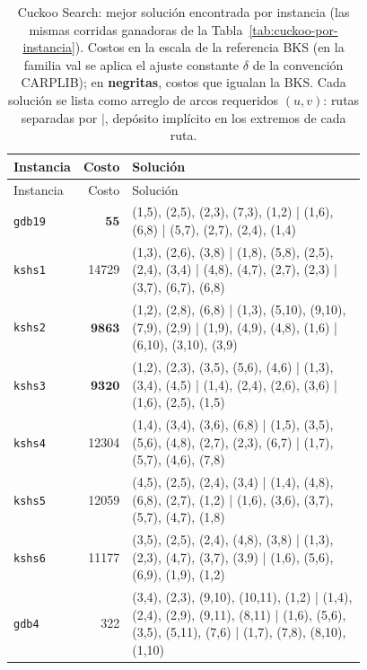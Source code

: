 \begin{landscape}
\begingroup\scriptsize
\begin{longtable}{lr>{\tiny\raggedright\arraybackslash}p{0.78\linewidth}}
\caption{Cuckoo Search: mejor solución encontrada por instancia (las mismas corridas ganadoras de la Tabla~\ref{tab:cuckoo-por-instancia}). Costos en la escala de la referencia BKS (en la familia val se aplica el ajuste constante $\delta$ de la convención CARPLIB); en \textbf{negritas}, costos que igualan la BKS. Cada solución se lista como arreglo de arcos requeridos $(u,v)$: rutas separadas por $|$, depósito implícito en los extremos de cada ruta.}\label{tab:soluciones-cuckoo}\\
\toprule
Instancia & Costo & Solución \\
\midrule
\endfirsthead
\toprule
Instancia & Costo & Solución \\
\midrule
\endhead
\bottomrule
\endfoot
\texttt{gdb19} & $\mathbf{55}$ & (1,5), (2,5), (2,3), (7,3), (1,2) | (1,6), (6,8) | (5,7), (2,7), (2,4), (1,4) \\[2pt]
\texttt{kshs1} & 14729 & (1,3), (2,6), (3,8) | (1,8), (5,8), (2,5), (2,4), (3,4) | (4,8), (4,7), (2,7), (2,3) | (3,7), (6,7), (6,8) \\[2pt]
\texttt{kshs2} & $\mathbf{9863}$ & (1,2), (2,8), (6,8) | (1,3), (5,10), (9,10), (7,9), (2,9) | (1,9), (4,9), (4,8), (1,6) | (6,10), (3,10), (3,9) \\[2pt]
\texttt{kshs3} & $\mathbf{9320}$ & (1,2), (2,3), (3,5), (5,6), (4,6) | (1,3), (3,4), (4,5) | (1,4), (2,4), (2,6), (3,6) | (1,6), (2,5), (1,5) \\[2pt]
\texttt{kshs4} & 12304 & (1,4), (3,4), (3,6), (6,8) | (1,5), (3,5), (5,6), (4,8), (2,7), (2,3), (6,7) | (1,7), (5,7), (4,6), (7,8) \\[2pt]
\texttt{kshs5} & 12059 & (4,5), (2,5), (2,4), (3,4) | (1,4), (4,8), (6,8), (2,7), (1,2) | (1,6), (3,6), (3,7), (5,7), (4,7), (1,8) \\[2pt]
\texttt{kshs6} & 11177 & (3,5), (2,5), (2,4), (4,8), (3,8) | (1,3), (2,3), (4,7), (3,7), (3,9) | (1,6), (5,6), (6,9), (1,9), (1,2) \\[2pt]
\texttt{gdb4} & 322 & (3,4), (2,3), (9,10), (10,11), (1,2) | (1,4), (2,4), (2,9), (9,11), (8,11) | (1,6), (5,6), (3,5), (5,11), (7,6) | (1,7), (7,8), (8,10), (1,10) \\[2pt]

\end{longtable}
\end{landscape}
